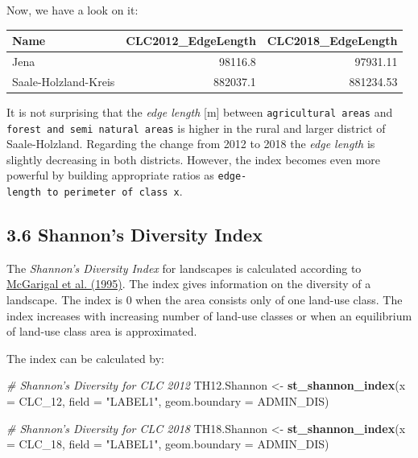 \documentclass[]{article}
\newenvironment{Shaded}{\begin{snugshade}}{\end{snugshade}}
\newcommand{\KeywordTok}[1]{\textcolor[rgb]{0.13,0.29,0.53}{\textbf{#1}}}
\newcommand{\DataTypeTok}[1]{\textcolor[rgb]{0.13,0.29,0.53}{#1}}
\newcommand{\DecValTok}[1]{\textcolor[rgb]{0.00,0.00,0.81}{#1}}
\newcommand{\StringTok}[1]{\textcolor[rgb]{0.31,0.60,0.02}{#1}}
\newcommand{\CommentTok}[1]{\textcolor[rgb]{0.56,0.35,0.01}{\textit{#1}}}
\newcommand{\NormalTok}[1]{#1}
\begin{document}
Now, we have a look on it:

\begin{longtable}[]{@{}lrr@{}}
\toprule
Name & CLC2012\_EdgeLength & CLC2018\_EdgeLength\tabularnewline
\midrule
\endhead
Jena & 98116.8 & 97931.11\tabularnewline
Saale-Holzland-Kreis & 882037.1 & 881234.53\tabularnewline
\bottomrule
\end{longtable}

It is not surprising that the \emph{edge length} {[}m{]} between
\texttt{agricultural\ areas} and
\texttt{forest\ and\ semi\ natural\ areas} is higher in the rural and
larger district of Saale-Holzland. Regarding the change from 2012 to
2018 the \emph{edge length} is slightly decreasing in both districts.
However, the index becomes even more powerful by building appropriate
ratios as \texttt{edge-length\ to\ perimeter\ of\ class\ x}.

\subsection{3.6 Shannon's Diversity
Index}\label{shannons-diversity-index}

The \emph{Shannon's Diversity Index} for landscapes is calculated
according to
\href{https://www.fs.usda.gov/treesearch/pubs/3064}{McGarigal et al.
(1995)}. The index gives information on the diversity of a landscape.
The index is 0 when the area consists only of one land-use class. The
index increases with increasing number of land-use classes or when an
equilibrium of land-use class area is approximated.

The index can be calculated by:

\begin{Shaded}
\begin{Highlighting}[]
\CommentTok{# Shannon's Diversity for CLC 2012}
\NormalTok{TH12.Shannon <-}\StringTok{ }\KeywordTok{st_shannon_index}\NormalTok{(}\DataTypeTok{x =}\NormalTok{ CLC_}\DecValTok{12}\NormalTok{, }\DataTypeTok{field =} \StringTok{"LABEL1"}\NormalTok{, }
                                 \DataTypeTok{geom.boundary =}\NormalTok{ ADMIN_DIS)}

\CommentTok{# Shannon's Diversity for CLC 2018}
\NormalTok{TH18.Shannon <-}\StringTok{ }\KeywordTok{st_shannon_index}\NormalTok{(}\DataTypeTok{x =}\NormalTok{ CLC_}\DecValTok{18}\NormalTok{, }\DataTypeTok{field =} \StringTok{"LABEL1"}\NormalTok{, }
                                 \DataTypeTok{geom.boundary =}\NormalTok{ ADMIN_DIS)}
\end{Highlighting}
\end{Shaded}
\end{document}
